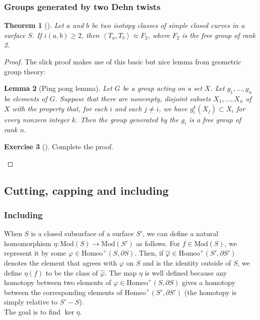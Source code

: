 \documentclass[reqno]{amsart}
\newtheorem{theorem}{Theorem}[section]
\newtheorem{lemma}[theorem]{Lemma}
\theoremstyle{definition}
\newtheorem{exercise}[theorem]{Exercise}
\theoremstyle{remark}
\newcommand{\Mod}{{\mathrm{Mod}}}
\newcommand{\Homeo}{{\mathrm{Homeo}}}
\begin{document}
\subsubsection*{Groups generated by two Dehn twists}

\begin{theorem}[]
    Let $a$ and $b$ be two isotopy classes of simple closed
    curves in a surface $S$. If $i(a,b) \ge 2$, then
    $\left<T_a ,T_b \right> \approx F_2$, where
    $F_2$ is the free group of rank 2.
\end{theorem}

\begin{proof}
   The slick proof makes use of this basic but nice
   lemma from geometric group theory:

\begin{lemma}[Ping pong lemma]
    Let $G$ be a group acting on a set $X$. Let
    $g_1, \ldots, g_n$ be elements of $G$. Suppose
    that there are nonempty, disjoint subsets $X_1, \ldots,
    X_n$ of $X$ with the property that, for each
    $i$ and each $j\neq i$, we have
    $g_i^{k} \left( X_j  \right) \subset X_i$ for every
    nonzero integer $k$. Then the group generated
    by the $g_i$ is a free group of rank $n$.
\end{lemma}

\begin{exercise}[]
    Complete the proof.
\end{exercise}


\end{proof}


\subsection{Cutting, capping and including}

\subsubsection{Including}

When $S$ is a closed subsurface of a surface $S'$, we
can define a natural homomorphism $\eta \colon
\Mod(S) \to \Mod(S')$ as follows. For
$f \in \Mod(S)$, we represent it by some
$\varphi \in \Homeo^{+} \left( S, \partial S \right) $. Then,
if $\hat{\varphi} \in \Homeo^{+} \left( S', \partial S' \right) $ 
denotes the element that agrees with $\varphi $ on $S$ and
is the identity outside of $S$, we define
$\eta (f)$ to be the class of $\hat{\varphi }$. The map
$\eta $ is well defined because any homotopy
between two elements of $\varphi \in \Homeo^{+} (S, \partial
S)$ gives a homotopy between the corresponding elements
of $\Homeo^{+}\left( S', \partial S' \right) $ (the homotopy
is simply relative to $S' - S$).\\
\linebreak
The goal is to find $\ker \eta$.
\end{document}
